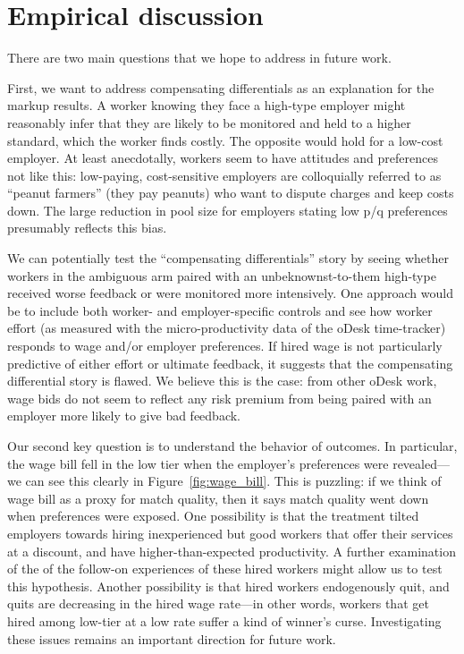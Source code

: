 \documentclass[prodmode,acmec]{ec-acmsmall}
\begin{document}
\section{Empirical discussion}
\label{sec:discussion}

There are two main questions that we hope to address in future work.

First, we want to address compensating differentials as an explanation for the markup results.
A worker knowing they face a high-type employer might reasonably infer that they are likely to be monitored and held to a higher standard, which the worker finds costly.
The opposite would hold for a low-cost employer. 
At least anecdotally, workers seem to have attitudes and preferences not like this:
low-paying, cost-sensitive employers are colloquially referred to as ``peanut farmers'' (they pay peanuts) who want to dispute charges and keep costs down.
The large reduction in pool size for employers stating low p/q preferences presumably reflects this bias.

We can potentially test the ``compensating differentials'' story by seeing whether workers in the ambiguous arm paired with an unbeknownst-to-them high-type received worse feedback or were monitored more intensively.
One approach would be to include both worker- and employer-specific controls and see how worker effort (as measured with the micro-productivity data of the oDesk time-tracker) responds to wage and/or employer preferences.
If hired wage is not particularly predictive of either effort or ultimate feedback, it suggests that the compensating differential story is flawed.
We believe this is the case: from other oDesk work, wage bids do not seem to reflect any risk premium from being paired with an employer more likely to give bad feedback.

Our second key question is to understand the behavior of outcomes.
In particular, the wage bill fell in the low tier when the employer's preferences were revealed---we can see this clearly in Figure~\ref{fig:wage_bill}. 
This is puzzling: if we think of wage bill as a proxy for match quality, then it says match quality went down when preferences were exposed. 
One possibility is that the treatment tilted employers towards hiring inexperienced but good workers that offer their services at a discount, and have higher-than-expected productivity.
A further examination of the of the follow-on experiences of these hired workers might allow us to test this hypothesis.  
Another possibility is that hired workers endogenously quit, and quits are decreasing in the hired wage rate---in other words, workers that get hired among low-tier at a low rate suffer a kind of winner's curse. 
Investigating these issues remains an important direction for future work.
\end{document}
